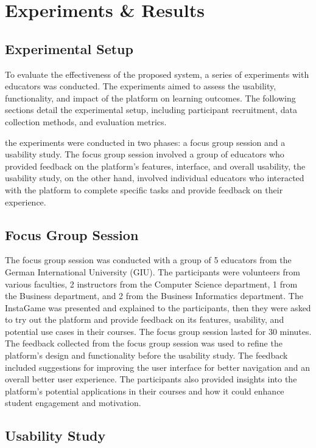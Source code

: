 \chapter{Experiments \& Results}\label{chap:results}

\section{Experimental Setup}
To evaluate the effectiveness of the proposed system, a series of experiments with educators was conducted. The experiments aimed to assess the usability, functionality, and impact of the platform on learning outcomes. The following sections detail the experimental setup, including participant recruitment, data collection methods, and evaluation metrics.


the experiments were conducted in two phases: a focus group session and a usability study. The focus group session involved a group of educators who provided feedback on the platform's features, interface, and overall usability, the usability study, on the other hand, involved individual educators who interacted with the platform to complete specific tasks and provide feedback on their experience.

\section{Focus Group Session}
The focus group session was conducted with a group of 5 educators from the German International University (GIU). The participants were volunteers from various faculties, 2 instructors from the Computer Science department, 1 from the Business department, and 2 from the Business Informatics department. The InstaGame was presented and explained to the participants, then they were asked to try out the platform and provide feedback on its features, usability, and potential use cases in their courses. The focus group session lasted for 30 minutes. The feedback collected from the focus group session was used to refine the platform's design and functionality before the usability study. The feedback included suggestions for improving the user interface for better navigation and an overall better user experience. The participants also provided insights into the platform's potential applications in their courses and how it could enhance student engagement and motivation.

\section{Usability Study}
